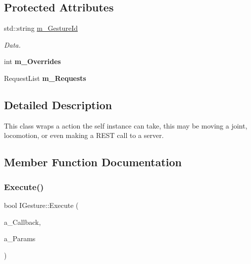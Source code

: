 \subsection*{Protected Attributes}
\begin{DoxyCompactItemize}
\item 
\mbox{\label{class_i_gesture_a7ddbab6bf28ab74e7b07c3c6e74806b0}} 
std\+::string \hyperlink{class_i_gesture_a7ddbab6bf28ab74e7b07c3c6e74806b0}{m\+\_\+\+Gesture\+Id}
\begin{DoxyCompactList}\small\item\em Data. \end{DoxyCompactList}\item 
\mbox{\label{class_i_gesture_a3a478c04712c15b9972bca47a59c2cea}} 
int {\bfseries m\+\_\+\+Overrides}
\item 
\mbox{\label{class_i_gesture_a7c23884d6aa459a2365fee0e32aaded8}} 
Request\+List {\bfseries m\+\_\+\+Requests}
\end{DoxyCompactItemize}


\subsection{Detailed Description}
This class wraps a action the self instance can take, this may be moving a joint, locomotion, or even making a R\+E\+ST call to a server. 

\subsection{Member Function Documentation}
\mbox{\label{class_i_gesture_aa48e38eda852843cab78c22dabfe7371}} 
\subsubsection{\texorpdfstring{Execute()}{Execute()}}
{\footnotesize\ttfamily bool I\+Gesture\+::\+Execute (\begin{DoxyParamCaption}\item[{Gesture\+Delegate}]{a\+\_\+\+Callback,  }\item[{const \hyperlink{class_params_map}{Params\+Map} \&}]{a\+\_\+\+Params }\end{DoxyParamCaption})\hspace{0.3cm}{\ttfamily [virtual]}}

